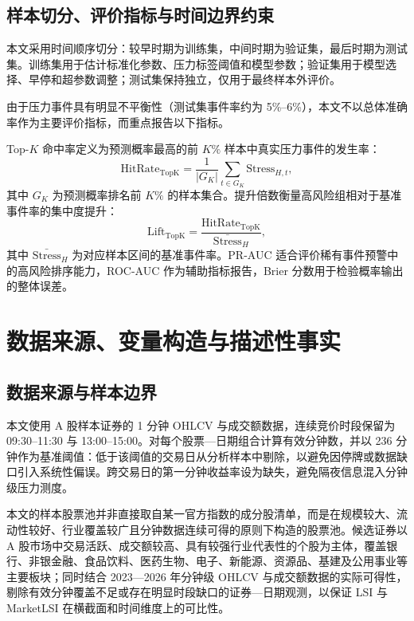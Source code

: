 \documentclass[12pt,a4paper]{ctexart}
\begin{document}
\subsection{样本切分、评价指标与时间边界约束}
\label{subsec:eval}

本文采用时间顺序切分：较早时期为训练集，中间时期为验证集，最后时期为测试集。训练集用于估计标准化参数、压力标签阈值和模型参数；验证集用于模型选择、早停和超参数调整；测试集保持独立，仅用于最终样本外评价。

由于压力事件具有明显不平衡性（测试集事件率约为 5\%--6\%），本文不以总体准确率作为主要评价指标，而重点报告以下指标。

Top-$K$ 命中率定义为预测概率最高的前 $K\%$ 样本中真实压力事件的发生率：
\begin{equation}
\mathrm{HitRate}_{\mathrm{TopK}}
=\frac{1}{|G_K|}\sum_{t\in G_K} \mathrm{Stress}_{H,t},
\end{equation}
其中 $G_K$ 为预测概率排名前 $K\%$ 的样本集合。提升倍数衡量高风险组相对于基准事件率的集中度提升：
\begin{equation}
\mathrm{Lift}_{\mathrm{TopK}}
=\frac{\mathrm{HitRate}_{\mathrm{TopK}}}{\bar{\mathrm{Stress}}_H},
\end{equation}
其中 $\bar{\mathrm{Stress}}_H$ 为对应样本区间的基准事件率。PR-AUC 适合评价稀有事件预警中的高风险排序能力，ROC-AUC 作为辅助指标报告，Brier 分数用于检验概率输出的整体误差。


\section{数据来源、变量构造与描述性事实}

\subsection{数据来源与样本边界}

本文使用 A 股样本证券的 1 分钟 OHLCV 与成交额数据，连续竞价时段保留为 09:30--11:30 与 13:00--15:00。对每个股票—日期组合计算有效分钟数，并以 236 分钟作为基准阈值：低于该阈值的交易日从分析样本中剔除，以避免因停牌或数据缺口引入系统性偏误。跨交易日的第一分钟收益率设为缺失，避免隔夜信息混入分钟级压力测度。

本文的样本股票池并非直接取自某一官方指数的成分股清单，而是在规模较大、流动性较好、行业覆盖较广且分钟数据连续可得的原则下构造的股票池。候选证券以 A 股市场中交易活跃、成交额较高、具有较强行业代表性的个股为主体，覆盖银行、非银金融、食品饮料、医药生物、电子、新能源、资源品、基建及公用事业等主要板块；同时结合 2023—2026 年分钟级 OHLCV 与成交额数据的实际可得性，剔除有效分钟覆盖不足或存在明显时段缺口的证券—日期观测，以保证 LSI 与 MarketLSI 在横截面和时间维度上的可比性。
\end{document}
